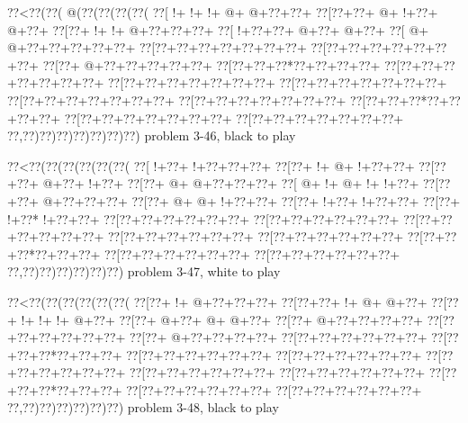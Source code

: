 \vbox{\vbox{\goo
\0??<\0??(\0??(\- @(\0??(\0??(\0??(\0??(
\0??[\- !+\- !+\- !+\- @+\- @+\0??+\0??+
\0??[\0??+\0??+\- @+\- !+\0??+\- @+\0??+
\0??[\0??+\- !+\- !+\- @+\0??+\0??+\0??+
\0??[\- !+\0??+\0??+\- @+\0??+\- @+\0??+
\0??[\- @+\- @+\0??+\0??+\0??+\0??+\0??+
\0??[\0??+\0??+\0??+\0??+\0??+\0??+\0??+
\0??[\0??+\0??+\0??+\0??+\0??+\0??+\0??+
\0??[\0??+\- @+\0??+\0??+\0??+\0??+\0??+
\0??[\0??+\0??+\0??*\0??+\0??+\0??+\0??+
\0??[\0??+\0??+\0??+\0??+\0??+\0??+\0??+
\0??[\0??+\0??+\0??+\0??+\0??+\0??+\0??+
\0??[\0??+\0??+\0??+\0??+\0??+\0??+\0??+
\0??[\0??+\0??+\0??+\0??+\0??+\0??+\0??+
\0??[\0??+\0??+\0??+\0??+\0??+\0??+\0??+
\0??[\0??+\0??+\0??*\0??+\0??+\0??+\0??+
\0??[\0??+\0??+\0??+\0??+\0??+\0??+\0??+
\0??[\0??+\0??+\0??+\0??+\0??+\0??+\0??+
\0??,\0??)\0??)\0??)\0??)\0??)\0??)\0??)
}
\hfil problem 3-46, black to play\hfil\break
}

\vbox{\vbox{\goo
\0??<\0??(\0??(\0??(\0??(\0??(\0??(
\0??[\- !+\0??+\- !+\0??+\0??+\0??+
\0??[\0??+\- !+\- @+\- !+\0??+\0??+
\0??[\0??+\0??+\- @+\0??+\- !+\0??+
\0??[\0??+\- @+\- @+\0??+\0??+\0??+
\0??[\- @+\- !+\- @+\- !+\- !+\0??+
\0??[\0??+\0??+\- @+\0??+\0??+\0??+
\0??[\0??+\- @+\- @+\- !+\0??+\0??+
\0??[\0??+\- !+\0??+\- !+\0??+\0??+
\0??[\0??+\- !+\0??*\- !+\0??+\0??+
\0??[\0??+\0??+\0??+\0??+\0??+\0??+
\0??[\0??+\0??+\0??+\0??+\0??+\0??+
\0??[\0??+\0??+\0??+\0??+\0??+\0??+
\0??[\0??+\0??+\0??+\0??+\0??+\0??+
\0??[\0??+\0??+\0??+\0??+\0??+\0??+
\0??[\0??+\0??+\0??*\0??+\0??+\0??+
\0??[\0??+\0??+\0??+\0??+\0??+\0??+
\0??[\0??+\0??+\0??+\0??+\0??+\0??+
\0??,\0??)\0??)\0??)\0??)\0??)\0??)
}
\hfil problem 3-47, white to play\hfil\break
}

\vbox{\vbox{\goo
\0??<\0??(\0??(\0??(\0??(\0??(\0??(
\0??[\0??+\- !+\- @+\0??+\0??+\0??+
\0??[\0??+\0??+\- !+\- @+\- @+\0??+
\0??[\0??+\- !+\- !+\- !+\- @+\0??+
\0??[\0??+\- @+\0??+\- @+\- @+\0??+
\0??[\0??+\- @+\0??+\0??+\0??+\0??+
\0??[\0??+\0??+\0??+\0??+\0??+\0??+
\0??[\0??+\- @+\0??+\0??+\0??+\0??+
\0??[\0??+\0??+\0??+\0??+\0??+\0??+
\0??[\0??+\0??+\0??*\0??+\0??+\0??+
\0??[\0??+\0??+\0??+\0??+\0??+\0??+
\0??[\0??+\0??+\0??+\0??+\0??+\0??+
\0??[\0??+\0??+\0??+\0??+\0??+\0??+
\0??[\0??+\0??+\0??+\0??+\0??+\0??+
\0??[\0??+\0??+\0??+\0??+\0??+\0??+
\0??[\0??+\0??+\0??*\0??+\0??+\0??+
\0??[\0??+\0??+\0??+\0??+\0??+\0??+
\0??[\0??+\0??+\0??+\0??+\0??+\0??+
\0??,\0??)\0??)\0??)\0??)\0??)\0??)
}
\hfil problem 3-48, black to play\hfil\break
}

